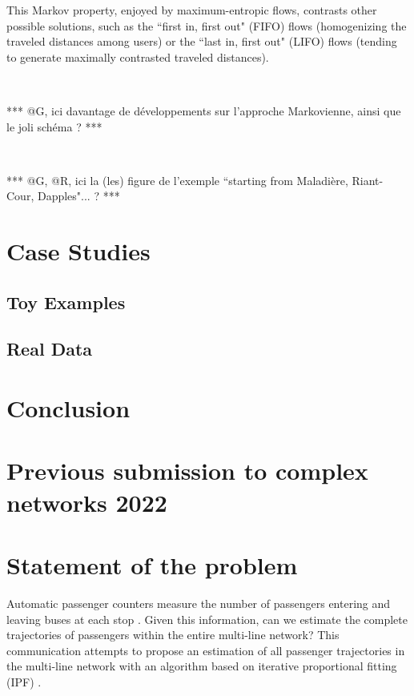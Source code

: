 \documentclass{bmcart}
\begin{document}
This Markov property, enjoyed by maximum-entropic flows, contrasts other possible solutions, such as  the ``first in, first out" (FIFO) flows (homogenizing the 
traveled distances among users) or the ``last in, first out" (LIFO) flows (tending to generate maximally  contrasted traveled distances).

\


***  @G, ici davantage de développements sur l'approche Markovienne, ainsi que le joli schéma ?  ***


\

*** @G, @R, ici la (les) figure de l'exemple  ``starting from Maladière, Riant-Cour, Dapples"... ? ***

 

\section{Case Studies}
\label{casestudies}

\subsection{Toy Examples}

\subsection{Real Data}


\section{Conclusion}

  
\newpage

\section*{Previous submission to complex networks 2022}

%
\section*{Statement of the problem}
%

Automatic passenger counters measure the number of passengers entering and leaving buses at each stop \cite{boyle_passenger_1998}. Given this information, can we estimate the complete trajectories of passengers within the entire multi-line network? This communication attempts to propose an estimation of all passenger trajectories in the multi-line network with an algorithm based on iterative proportional fitting (IPF) \cite{bishop_discrete_2007}.
\end{document}
